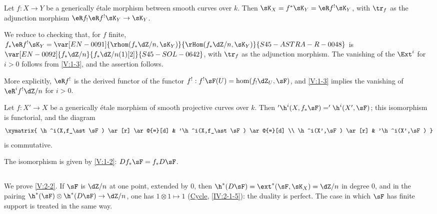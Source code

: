 \begin{lemma_}\label{V:2-3}
Let $f:X\to Y$ be a generically étale morphism between smooth curves over
$k$. Then $\sK_X=f^\ast\sK_Y=\eR f^!\sK_Y$, with $\tr_f$ as the adjunction
morphism $\eR f_!\eR f^!\sK_Y\to \sK_Y$.
\end{lemma_}

We reduce to checking that, for $f$ finite,
$f_\ast \eR f^!\sK_Y = \var[EN-0091]{\rhom(f_\ast\dZ/n,\sK_Y)}{\rHom(f_\ast\dZ/n,\sK_Y)}{S45-ASTRA-R-0048}$ is $\var[EN-0092]{f_\ast\dZ/n}{f_\ast\dZ/n(1)[2]}{S45-SOL-0642}$, with $\tr_f$ as the adjunction morphism. The vanishing of the $\Ext^i$ for $i>0$
follows from \ref{V:1-3}, and the assertion follows.

More explicitly, $\eR f^!$ is the derived functor of the functor
$f^!:f^!\sF(U)=\hom(f_!\dZ_U,\sF)$, and \ref{V:1-3} implies the vanishing of
$\eR^i f^!\dZ/n$ for $i>0$.


\begin{corollary_}\label{V:2-4}
Let $f:X'\to X$ be a generically étale morphism of smooth projective curves
over $k$. Then $'\h^i(X,f_\ast \sF)='\h^i(X',\sF)$; this isomorphism is
functorial, and the diagram
\[\xymatrix{
  \h^i(X,f_\ast\sF) \ar[r] \ar@{=}[d]
    & '\h^i(X,f_\ast\sF) \ar@{=}[d] \\
  \h^i(X',\sF) \ar[r]
    & '\h^i(X',\sF)
}\]
is commutative.
\end{corollary_}

The isomorphism is given by \ref{V:1-2}: $D f_\ast\sF=f_\ast D\sF$.


\subsection{}\label{V:2-5}

We prove \ref{V:2-2}. If $\sF$ is $\dZ/n$ at one point, extended by $0$,
then $\h^*(D\sF) = \ext^*(\sF,\sK_X)=\dZ/n$ in degree $0$, and
in the pairing $\h^*(\sF)\otimes\h^*(D\sF) \to \dZ/n$, one has
$1\otimes 1\mapsto 1$ (\hyperref[IV]{Cycle}, \ref{IV:2-1-5}): the duality is
perfect. The case in which $\sF$ has finite support is treated in the same
way.

